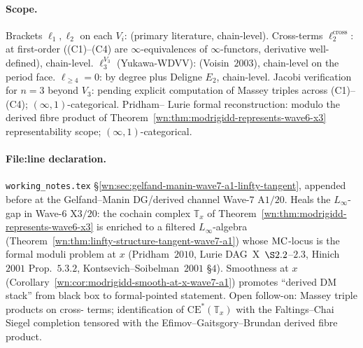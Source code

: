 \paragraph{Scope.} Brackets $\ell_1,\ell_2$ on each $V_i$:
\ClaimStatusTheorem{} (primary literature, chain-level).
Cross-terms $\ell_2^{\mathrm{cross}}$: \ClaimStatusTheorem{}
at first-order ((C1)--(C4) are $\infty$-equivalences of
$\infty$-functors, derivative well-defined), chain-level.
$\ell_3^{V_3}$ (Yukawa-WDVV): \ClaimStatusTheorem{}
(Voisin~$2003$), chain-level on the period face.
$\ell_{\geq 4}=0$: \ClaimStatusTheorem{} by degree plus Deligne
$E_2$, chain-level. Jacobi verification for $n=3$ beyond $V_3$:
\ClaimStatusConjectured{} pending explicit computation of Massey
triples across (C1)--(C4); $(\infty,1)$-categorical. Pridham--
Lurie formal reconstruction: \ClaimStatusTheorem{} modulo the
derived fibre product of
Theorem~\ref{wn:thm:modrigidd-represents-wave6-x3}
representability scope; $(\infty,1)$-categorical.

\paragraph{File:line declaration.} \texttt{working\_notes.tex}
\S\ref{wn:sec:gelfand-manin-wave7-a1-linfty-tangent}, appended
before \verb|| at the Gelfand--Manin DG/derived
channel Wave-$7$ A$1/20$. Heals the $L_\infty$-gap in Wave-$6$
X$3/20$: the cochain complex $\mathbb T_x$ of
Theorem~\ref{wn:thm:modrigidd-represents-wave6-x3} is enriched
to a filtered $L_\infty$-algebra
(Theorem~\ref{wn:thm:linfty-structure-tangent-wave7-a1}) whose
$\mathrm{MC}$-locus is the formal moduli problem at $x$
(Pridham~$2010$, Lurie DAG~X~$\S 2.2$--$2.3$, Hinich~$2001$
Prop.~$5.3.2$, Kontsevich--Soibelman~$2001$ \S$4$). Smoothness
at $x$ (Corollary~\ref{wn:cor:modrigidd-smooth-at-x-wave7-a1})
promotes ``derived DM stack'' from black box to formal-pointed
statement. Open follow-on: Massey triple products on cross-
terms; identification of $\mathrm{CE}^*(\mathbb T_x)$ with the
Faltings--Chai Siegel completion tensored with the
Efimov--Gaitsgory--Brundan derived fibre product.
